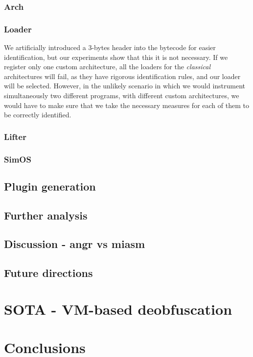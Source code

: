 \subsection{Arch}

\subsection{Loader}

We artificially introduced a 3-bytes header into the bytecode for easier identification, but our experiments show that this it is not necessary. If we register only one custom architecture, all the loaders for the \emph{classical} architectures will fail, as they have rigorous identification rules, and our loader will be selected. However, in the unlikely scenario in which we would instrument simultaneously two different programs, with different custom architectures, we would have to make sure that we take the necessary measures for each of them to be correctly identified.

\subsection{Lifter}

\subsection{SimOS}

\section{Plugin generation}

\section{Further analysis}

\section{Discussion - angr vs miasm}


\section{Future directions}


\chapter{SOTA - VM-based deobfuscation} %

\chapter{Conclusions}


